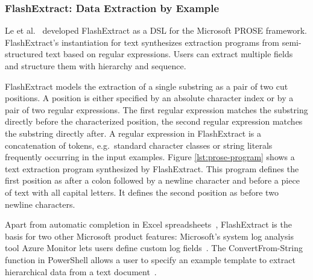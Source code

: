 

\subsubsection{FlashExtract: Data Extraction by Example}
Le et al.~\cite{le2014flashextract:} developed FlashExtract as a DSL
for the Microsoft PROSE framework.
FlashExtract's instantiation for text synthesizes extraction programs
from semi-structured text based on regular expressions.
Users can
extract multiple fields and structure them with hierarchy and
sequence.

FlashExtract models the extraction of a single substring as a pair of
two cut positions.
A position is either specified by an absolute
character index or by a pair of two regular expressions.
The first
regular expression matches the substring directly before the
characterized position, the second regular expression matches the
substring directly after.
A regular expression in FlashExtract is a
concatenation of tokens, e.g.\ standard character classes or string
literals frequently occurring in the input examples.
Figure
\ref{lst:prose-program} shows a text extraction program synthesized by
FlashExtract.
This program defines the first position as after a colon
followed by a newline character and before a piece of text with all
capital letters.
It defines the second position as before two newline
characters.

Apart from automatic completion in Excel
spreadsheets~\cite{excel2019flashfill}, FlashExtract is the basis for
two other Microsoft product features: Microsoft's system log analysis
tool Azure Monitor lets users define custom log
fields~\cite{azure2019custom}.
The ConvertFrom-String function in
PowerShell allows a user to specify an example template to extract
hierarchical data from a text document~\cite{powershell2019convert}.

